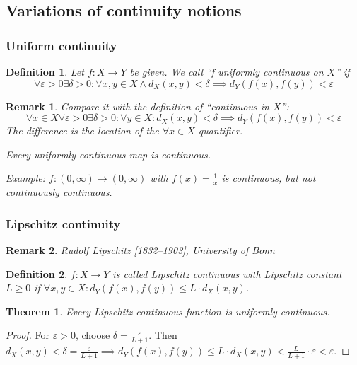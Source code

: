 \documentclass{article}
\newtheorem{theorem}{Theorem}  \numberwithin{theorem}{section}
\newtheorem{definition}{Definition}  \numberwithin{definition}{section}
\newtheorem{remark}{Remark}  \numberwithin{remark}{section}
\begin{document}
\subsection{Variations of continuity notions}
\subsubsection{Uniform continuity}

\begin{definition} %
  Let $f: X \to Y$ be given.
  We call \enquote{f uniformly continuous on $X$} if
  \[
  	\forall \varepsilon > 0 \exists \delta > 0:
  	\forall x, y \in X \land d_X(x,y) < \delta \implies d_Y(f(x), f(y)) < \varepsilon
  \]
\end{definition}

\begin{remark}
  Compare it with the definition of \enquote{continuous in $X$}:
  \[ \forall x \in X \forall \varepsilon > 0 \exists \delta > 0: \forall y \in X: d_X(x,y) < \delta \implies d_Y(f(x), f(y)) < \varepsilon \]
  The difference is the location of the $\forall x \in X$ quantifier.

  Every uniformly continuous map is continuous.

  Example: $f: (0, \infty) \to (0, \infty)$ with $f(x) = \frac1x$ is continuous, but not continuously continuous.
\end{remark}

\subsubsection{Lipschitz continuity}
\begin{remark}
  Rudolf Lipschitz [1832--1903], University of Bonn
\end{remark}
\begin{definition} %
  $f: X \to Y$ is called \emph{Lipschitz continuous} with \emph{Lipschitz constant} $L \geq 0$ if $\forall x, y \in X: d_Y(f(x), f(y)) \leq L \cdot d_X(x,y)$.
\end{definition}

\begin{theorem}
  Every Lipschitz continuous function is uniformly continuous.
\end{theorem}
\begin{proof}
  For $\varepsilon > 0$, choose $\delta = \frac{\varepsilon}{L+1}$. Then
  $d_X(x,y) < \delta = \frac{\varepsilon}{L+1} \implies d_Y(f(x), f(y)) \leq L \cdot d_X(x,y) < \frac{L}{L+1} \cdot \varepsilon < \varepsilon$.
\end{proof}
\end{document}
